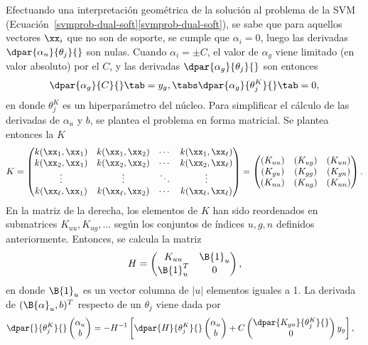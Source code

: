 %
Efectuando una interpretación geométrica de la solución al problema de
la SVM (\iflatexml{}Ecuación~\ref{svmprob-dual-soft}\else\autoref{svmprob-dual-soft}\fi),
se sabe que para aquellos vectores $\xx_i$ que no son de soporte, se
cumple que $\alpha_i=0$, luego las derivadas
$\dpar{\alpha_n}{\theta_j}{}$ son nulas.
Cuando $\alpha_i=\pm{}C$, el valor de $\alpha_g$ viene limitado (en
valor absoluto) por el \hparam{} $C$, y las derivadas
$\dpar{\alpha_g}{\theta_j}{}$ son entonces
%
\begin{align}
  \dpar{\alpha_g}{C}{} \tab= y_g, \tabs
  \dpar{\alpha_g}{{\theta}^K_j}{} \tab= 0,
\end{align}
%
en donde $\theta_j^K$ es un hiperparámetro del núcleo.
Para simplificar el cálculo de las derivadas de $\alpha_u$ y $b$, se
plantea el problema en forma matricial.
Se plantea entonces la  $K$
%
\begin{align}
  K = \begin{pmatrix} k(\xx_1,\xx_1) & k(\xx_1,\xx_2) & \cdots & k(\xx_1,\xx_\ell)
    \\ k(\xx_2,\xx_1) & k(\xx_2,\xx_2) & \cdots & k(\xx_2,\xx_\ell) \\ \vdots &
    \vdots & \ddots & \vdots \\ k(\xx_\ell,\xx_1) & k(\xx_\ell,\xx_2) & \cdots &
    k(\xx_\ell,\xx_\ell)
  \end{pmatrix}
  =
  \begin{pmatrix}
    (K_{uu}) & (K_{ug}) & (K_{un}) \\
    (K_{gu}) & (K_{gg}) & (K_{gn}) \\
    (K_{nu}) & (K_{ng}) & (K_{nn})
  \end{pmatrix}.
\end{align}
%
En la matriz de la derecha, los elementos de $K$ han sido reordenados
en submatrices $K_{uu},K_{ug},\ldots$ según los conjuntos de índices
$u, g, n$ definidos anteriormente.
Entonces, se calcula la matriz
%
\begin{align}
  H=\begin{pmatrix} K_{uu} & \B{1}_u \\ \B{1}_u^T & 0
  \end{pmatrix},
\end{align}
%
en donde $\B{1}_u$ es un vector columna de $|u|$ elementos iguales a 1.
La derivada de $(\B{\alpha}_u,b)^T$ respecto de un \hparam{}
$\theta_j$ viene dada por
%
\begin{align}
  \dpar{}{\theta^K_j}{} \begin{pmatrix}\alpha_{u}\\b\end{pmatrix} &=
    -H^{-1} \left[
      \dpar{H}{\theta^K_j}{}
      \begin{pmatrix}\alpha_{u}\\b\end{pmatrix}
        +C \begin{pmatrix}\dpar{K_{gu}}{\theta^K_j}{}\\0\end{pmatrix}
          y_g
          \right],
\end{align}
